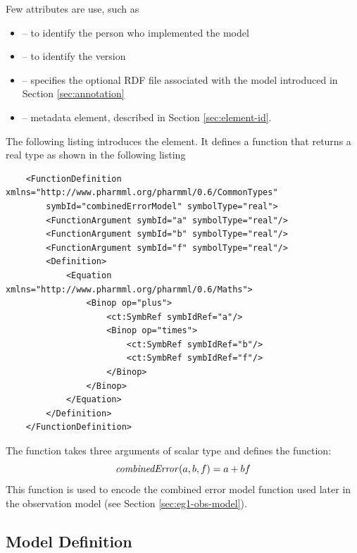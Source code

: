 Few attributes are use, such as
\begin{itemize}
\item
{} -- to identify the person who implemented the model
\item
{} -- to identify the \pharmml version
\item
{} -- specifies the optional RDF file associated with the model
introduced in Section \ref{sec:annotation}
\item
{} -- metadata element, described in Section \ref{sec:element-id}.
\end{itemize}

The following listing introduces the  element. 
It defines a function that returns a real type as shown in the following listing 
\lstset{language=XML}
\begin{lstlisting}
    <FunctionDefinition xmlns="http://www.pharmml.org/pharmml/0.6/CommonTypes" 
    	symbId="combinedErrorModel" symbolType="real">
        <FunctionArgument symbId="a" symbolType="real"/>
        <FunctionArgument symbId="b" symbolType="real"/>
        <FunctionArgument symbId="f" symbolType="real"/>
        <Definition>
            <Equation xmlns="http://www.pharmml.org/pharmml/0.6/Maths">
                <Binop op="plus">
                    <ct:SymbRef symbIdRef="a"/>
                    <Binop op="times">
                        <ct:SymbRef symbIdRef="b"/>
                        <ct:SymbRef symbIdRef="f"/>
                    </Binop>
                </Binop>
            </Equation>
        </Definition>
    </FunctionDefinition>
\end{lstlisting}

The function takes three arguments of scalar type and defines the
function:
\begin{displaymath}
\var{combinedError}(a, b, f) = a + bf
\end{displaymath}
This function is used to encode the combined error model function used later in
the observation model (see Section \ref{sec:eg1-obs-model}).


\subsection{Model Definition}

